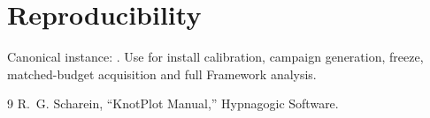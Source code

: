 \documentclass[11pt,a4paper]{article}
\begin{document}
\section{Reproducibility}
Canonical instance: . Use  for install calibration, campaign generation, freeze, matched-budget acquisition and full Framework analysis.
\begin{thebibliography}{9}
 R.~G. Scharein, ``KnotPlot Manual,'' Hypnagogic Software.
\end{thebibliography}
\end{document}
